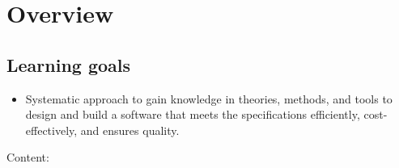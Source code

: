 \section*{Overview}
\subsection*{Learning goals}
\begin{itemize}
\item Systematic approach to gain knowledge in theories, methods,
and tools to design and build a software that meets the specifications
efficiently, cost-effectively, and ensures quality.
\end{itemize}
\newslide
Content:
